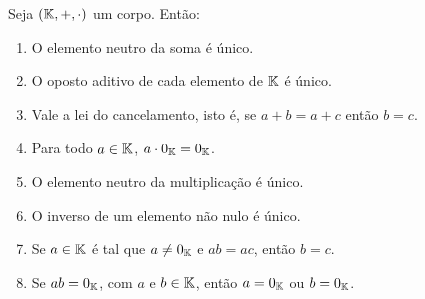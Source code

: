 \begin{proposicao}
	Seja $(\mathbb{K}, +, \cdot)$ um corpo. Ent\~ao:
	\begin{enumerate}[label={\roman*})]
		\item O elemento neutro da soma \'e \'unico.
		\item O oposto aditivo de cada elemento de $\mathbb{K}$ \'e \'unico.
		\item Vale a lei do cancelamento, isto \'e, se $a + b = a + c$ ent\~ao $b = c$.
		\item Para todo $a \in \mathbb{K}$, $a\cdot 0_{\mathbb{K}} = 0_{\mathbb{K}}$.
		\item O elemento neutro da multiplica\c{c}\~ao \'e \'unico.
		\item O inverso de um elemento n\~ao nulo \'e \'unico.
		\item Se $a \in \mathbb{K}$ \'e tal que $a \ne 0_{\mathbb{K}}$ e $ab = ac$, ent\~ao $b = c$.
		\item Se $ab = 0_{\mathbb{K}}$, com $a$ e $b \in \mathbb{K}$, ent\~ao $a = 0_{\mathbb{K}}$ ou $b = 0_{\mathbb{K}}$.
	\end{enumerate}
\end{proposicao}
